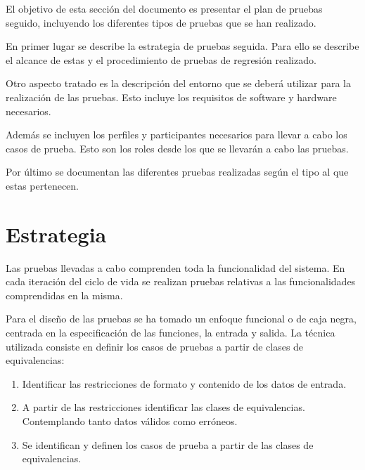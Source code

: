

El objetivo de esta sección del documento es presentar el plan de pruebas seguido, 
incluyendo los diferentes tipos de pruebas que se han realizado. 

En primer lugar se describe la estrategia de pruebas seguida. Para ello se describe 
el alcance de estas y el procedimiento de pruebas de regresión realizado. 

Otro aspecto tratado es la descripción del entorno que se deberá utilizar para la
realización de las pruebas. Esto incluye los requisitos de software y hardware necesarios. 

Además se incluyen los perfiles y participantes necesarios para llevar a cabo los casos 
de prueba. Esto son los roles desde los que se llevarán a cabo las pruebas.

Por último se documentan las diferentes pruebas realizadas según el tipo al que estas pertenecen.

\section{Estrategia}
Las pruebas llevadas a cabo comprenden toda la funcionalidad del sistema. En cada iteración del ciclo de
vida se realizan pruebas relativas a las funcionalidades comprendidas en la misma. 

Para el diseño de las pruebas se ha tomado un enfoque funcional o de caja negra, centrada en la 
especificación de las funciones, la entrada y salida. La técnica utilizada consiste en definir 
los casos de pruebas a partir de clases de equivalencias:

\begin{enumerate}
\item Identificar las restricciones de formato y contenido de los datos de entrada.
\item A partir de las restricciones identificar las clases de equivalencias. Contemplando tanto 
datos válidos como erróneos.
\item Se identifican y definen los casos de prueba a partir de las clases de equivalencias.
\end{enumerate}

